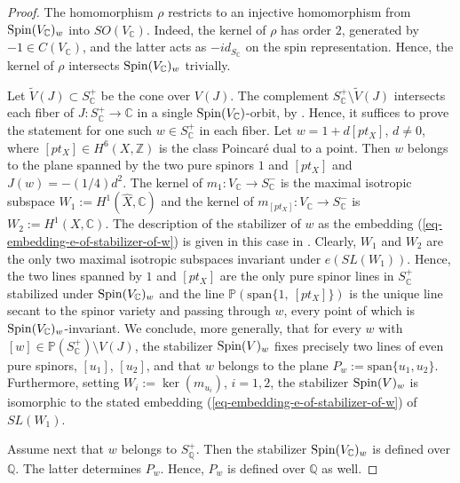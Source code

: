 \documentclass[12pt]{amsart}
\newcommand{\hide}[1]{}
\numberwithin{equation}{subsection}
\theoremstyle{plain}
\theoremstyle{definition}
\newcommand{\CC}{{\mathbb C}}
\newcommand{\QQ}{{\mathbb Q}}
\newcommand{\PP}{{\mathbb P}}
\newcommand{\Integers}{{\mathbb Z}}
\newcommand{\ComplexNumbers}{{\mathbb C}}
\newcommand{\Spin}{{\rm Spin}}
\begin{document}
\begin{proof}
The homomorphism $\rho$ restricts to an injective homomorphism from $\Spin(V_\CC)_w$ into $SO(V_\CC)$.
Indeed, the kernel of $\rho$ has order $2$, generated by $-1\in C(V_\CC)$, and the latter
acts as $-id_{S_\CC}$ on the spin representation. Hence, the kernel of $\rho$ intersects $\Spin(V_\CC)_w$ trivially.


Let $\tilde{V}(J)\subset S^+_\CC$ be the cone over $V(J)$.
The complement $S^+_\CC\setminus \tilde{V}(J)$ intersects each fiber of $J:S^+_\CC\rightarrow \CC$ in a single $\Spin(V_\CC)$-orbit, by \cite[Prop. 3]{igusa}. 
Hence, it suffices to prove the statement for one such $w\in S^+_\ComplexNumbers$ in each fiber. 
Let $w=1+d[pt_X]$, $d\neq 0$, where $[pt_X]\in H^6(X,\Integers)$ is the class Poincar\'{e} dual to a point. 
Then $w$ belongs to the plane spanned by the two pure spinors $1$ and $[pt_X]$ and $J(w)=-(1/4)d^2$. 
The kernel of $m_1:V_\CC\rightarrow S^-_\CC$ is the maximal isotropic subspace $W_1:=H^1(\hat{X},\CC)$ and 
the kernel of $m_{[pt_X]}:V_\CC\rightarrow S^-_\CC$ is $W_2:=H^1(X,\CC)$. The description of the stabilizer of 
$w$ as the embedding (\ref{eq-embedding-e-of-stabilizer-of-w}) 
is given in this case in \cite[Lemma 2]{igusa}. Clearly, $W_1$ and $W_2$ are the only two maximal isotropic subspaces invariant under $e(SL(W_1))$. Hence, the two lines spanned by $1$ and $[pt_X]$ are the only pure spinor lines in $S^+_\CC$ stabilized under $\Spin(V_\CC)_w$ and the line
$\PP(\mbox{span}\{1, \ [pt_X]\})$ is the unique line secant to the spinor variety and passing through $w$, every point of which 
is $\Spin(V_\CC)_w$-invariant. We conclude, 
more generally, that for every $w$ with $[w]\in \PP(S^+_\CC)\setminus V(J)$, the  stabilizer $\Spin(V)_w$ fixes precisely two lines of even pure spinors, $[u_1]$, $[u_2]$, 
and that  $w$ belongs to the plane $P_w:=\mbox{span}\{u_1, u_2\}$. Furthermore, setting $W_i:=\ker(m_{u_i})$, 
$i=1,2$, the stabilizer $\Spin(V)_w$ is isomorphic to the stated embedding (\ref{eq-embedding-e-of-stabilizer-of-w}) of $SL(W_1)$. 

Assume next that $w$ belongs to $S^+_\QQ$. Then the stabilizer $\Spin(V_\CC)_w$ is defined over $\QQ$. 
The latter determines $P_w$. Hence, $P_w$ is defined over $\QQ$ as well.
\hide{
to 
the pair $\{W_1, W_2\}$ is determined by the stabilizer $\Spin(V)_w$, and hence so does the plain $P_w$ spanned by the 

}
\end{proof}
\end{document}
